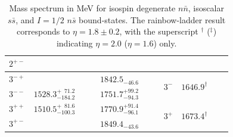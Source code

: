 \begin{table}[!th]
\begin{tabular}{c|ccc|ccc||c|ccc}
$2^{+-}$                    &                                      &                                    &                &                           &                           &                   &         &     & & \\
\hline                                                                                                                                                                                                     
$3^{-+}$                    &                                      &                                    &                &  $1842.5_{-46.6}$         &                           &                   &  \multirow{2}{*}{$3^-$}       & \multirow{2}{*}{ $1646.9^\dag$ }  &  \multirow{2}{*}{} & \multirow{2}{*}{} \\
$3^{--}$                    & $1528.3^{+\phantom{1}71.2}_{-184.2}$ &                                    &                &  $1751.7^{+99.2}_{-94.3}$ &                           &                   &         &     & & \\
$3^{++}$                    & $1510.5^{+\phantom{1}81.6}_{-100.3}$ &                                    &                &  $1770.9^{+91.4}_{-96.1}$ &                           &                   &  \multirow{2}{*}{$3^+$}       & \multirow{2}{*}{ $1673.4^\dag$  } &  \multirow{2}{*}{} & \multirow{2}{*}{} \\
$3^{+-}$                    &  									&                                    &                &  $1849.4_{-43.6}$  &                           &                   &         &     & & \\                                                                                                                                                                      
\hline
\hline
\end{tabular}
\caption{Mass spectrum in MeV for isospin degenerate $n\bar{n}$, isoscalar $s\bar{s}$, and $I=1/2$ $n\bar{s}$ bound-states. The rainbow-ladder result corresponds to $\eta=1.8\pm0.2$, with the 
superscript ${}^\dag$ (${}^\ddag$) indicating $\eta=2.0$ ($\eta=1.6$) only.}\label{tab:results}
\end{table}
%
%
%
%
%
%
\\

